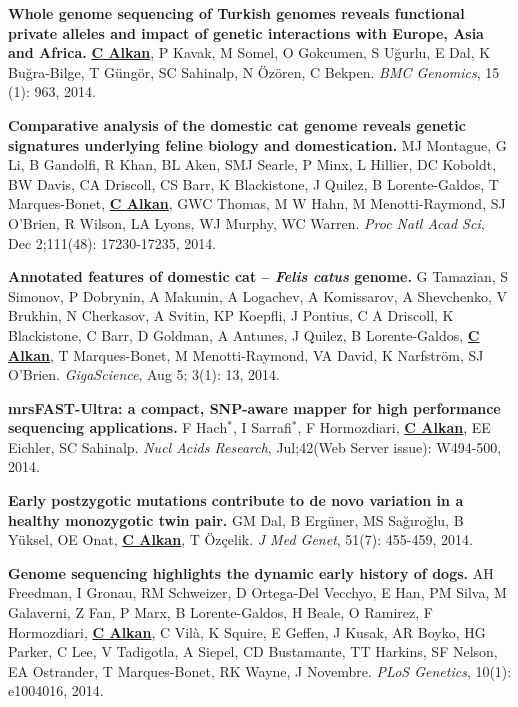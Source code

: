   \vspace{-.2cm}        
  {\bf Whole genome sequencing of Turkish genomes reveals functional private alleles and impact of genetic interactions with Europe, Asia and Africa.}
  {\bf {\underline {C Alkan}}}, P Kavak, M Somel, O Gokcumen, S Uğurlu, E Dal, K Buğra-Bilge,  T Güngör, SC Sahinalp, N Özören, C Bekpen.
  {\em BMC Genomics}, 15 (1): 963, 2014.


  \vspace{-.2cm}        
  {\bf Comparative analysis of the domestic cat genome reveals genetic signatures underlying feline biology and domestication.}
  MJ Montague, G Li, B Gandolfi, R Khan, BL Aken, SMJ Searle, P Minx, L Hillier, DC Koboldt, BW Davis, CA Driscoll, 
  CS Barr, K Blackistone, J Quilez, B Lorente-Galdos, T Marques-Bonet, {\bf {\underline {C Alkan}}}, GWC Thomas, M W Hahn, M Menotti-Raymond, 
  SJ O’Brien, R Wilson, LA Lyons, WJ Murphy, WC Warren. {\em Proc Natl Acad Sci}, Dec 2;111(48): 17230-17235, 2014.

  \vspace{-.2cm}        
  {\bf Annotated features of domestic cat – \textit{Felis catus} genome.}
  G Tamazian, S Simonov, P Dobrynin, A Makunin, A Logachev, 
  A Komissarov, A Shevchenko, V Brukhin, N Cherkasov, A Svitin,
  KP Koepfli, J Pontius, C A Driscoll, K Blackistone, C Barr, 
  D Goldman, A Antunes, J Quilez, B Lorente-Galdos,  {\bf {\underline {C Alkan}}},
  T Marques-Bonet, M Menotti-Raymond, VA David, K Narfström, SJ O’Brien.
  {\em GigaScience}, Aug 5; 3(1): 13, 2014.
       
       
       
  \vspace{-.2cm}        
  {\bf mrsFAST-Ultra: a compact, SNP-aware mapper for high performance sequencing applications.}
    F Hach$^*$,
    I Sarrafi$^*$,
    F Hormozdiari,
    {\bf {\underline {C Alkan}}},
    EE Eichler,   SC Sahinalp.
    {\em Nucl Acids Research}, Jul;42(Web Server issue): W494-500, 2014.

  \vspace{-.2cm}        
         {\bf Early postzygotic mutations contribute to de novo variation in a healthy monozygotic twin pair.}
         GM Dal, B Ergüner, MS Sağıroğlu, B Yüksel, OE Onat, {\bf {\underline {C Alkan}}}, T Özçelik. 
         {\em J Med Genet}, 51(7): 455-459, 2014.

  \clearpage
  \vspace{-.2cm}        
         {\bf Genome sequencing highlights the dynamic early history of dogs.} 
         AH Freedman, I Gronau, RM Schweizer, D Ortega-Del Vecchyo, E Han, PM Silva, 
         M Galaverni, Z Fan, P Marx, B Lorente-Galdos, H Beale, O Ramirez, F Hormozdiari, 
         {\bf {\underline {C Alkan}}}, 
         C Vilà, K Squire, E Geffen, J Kusak, AR Boyko, HG Parker, 
         C Lee, V Tadigotla, A Siepel, CD Bustamante, TT Harkins, SF Nelson, 
         EA Ostrander, T Marques-Bonet, RK Wayne, J Novembre. 
         {\em PLoS Genetics}, 10(1): e1004016, 2014.



